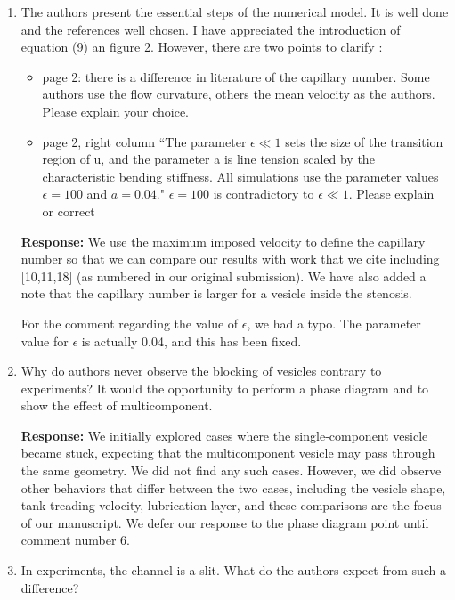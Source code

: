 \documentclass[11pt]{article}
\begin{document}
\begin{enumerate}
\item The authors present the essential steps of the numerical model. It
  is well done and the references well chosen. I have appreciated the
    introduction of equation (9) an figure 2. However, there are two
    points to clarify :
    \begin{itemize}
      \item page 2: there is a difference in literature of the
        capillary number. Some authors use the flow curvature, others
        the mean velocity as the authors. Please explain your choice.
      \item page 2, right column ``The parameter $\epsilon \ll 1$ sets
        the size of the transition region of u, and the parameter a is
        line tension scaled by the characteristic bending stiffness. All
        simulations use the parameter values $\epsilon = 100$ and $a =
        0.04.$" $\epsilon = 100$ is contradictory to $\epsilon \ll 1$.
        Please explain or correct
    \end{itemize}

\noindent
{\bf Response:} We use the maximum imposed velocity to define the
capillary number so that we can compare our results with work that we
cite including [10,11,18] (as numbered in our original submission). We
have also added a note that the capillary number is larger for a vesicle
inside the stenosis.

For the comment regarding the value of $\epsilon$, we had a
typo. The parameter value for $\epsilon$ is actually 0.04, and this has
been fixed.

\item Why do authors never observe the blocking of vesicles contrary to
  experiments? It would the opportunity to perform a phase diagram and
    to show the effect of multicomponent.

\noindent
{\bf Response:} We initially explored cases where the single-component
vesicle became stuck, expecting that the multicomponent vesicle may pass
through the same geometry. We did not find any such cases.
However, we did observe other behaviors that differ between the two
cases, including the vesicle shape, tank treading velocity, lubrication
layer, and these comparisons are the focus of our manuscript. We defer
our response to the phase diagram point until comment number 6.

%

\item In experiments, the channel is a slit. What do the authors expect
  from such a difference?


\end{enumerate}
\end{document}
